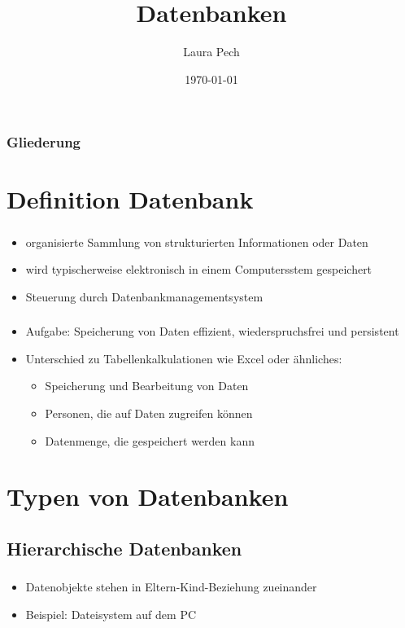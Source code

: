 \documentclass[aspectratio=169,14pt,xcolor=dvipsnames]{beamer}
\title{Datenbanken}
\author[]{Laura Pech}
\institute{Unitedprint.com SE\\Auszubildende Fachinformatikerin für Anwendungsentwicklung}
\date{\today}
\begin{document}
\maketitle

\begin{frame}[t]
    \frametitle{Gliederung}
    \hypersetup{linkcolor=black}
    \tableofcontents%
\end{frame}

\section{Definition Datenbank}

\begin{frame}[t]
    \frametitle{\secname}
    \begin{itemize}
        \item organisierte Sammlung von strukturierten Informationen oder Daten
        \item wird typischerweise elektronisch in einem Computersstem gespeichert
        \item Steuerung durch Datenbankmanagementsystem
    \end{itemize}
\end{frame}

\begin{frame}[t]
    \frametitle{\secname}
    \begin{itemize}
        \item Aufgabe: Speicherung von Daten effizient, wiederspruchsfrei und persistent
        \item Unterschied zu Tabellenkalkulationen wie Excel oder ähnliches:
        \begin{itemize}
            \item Speicherung und Bearbeitung von Daten
            \item Personen, die auf Daten zugreifen können
            \item Datenmenge, die gespeichert werden kann
        \end{itemize}
    \end{itemize}
\end{frame}

\section{Typen von Datenbanken}

\subsection{Hierarchische Datenbanken}
\begin{frame}[t]
    \frametitle{\subsecname}
    \begin{itemize}
        \item Datenobjekte stehen in Eltern-Kind-Beziehung zueinander
        \item Beispiel: Dateisystem auf dem PC
    \end{itemize}
\end{frame}
\end{document}
